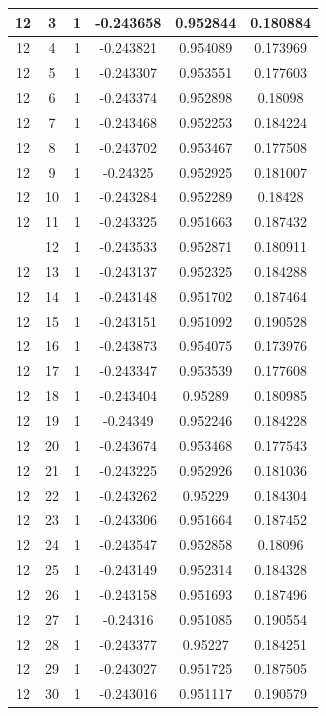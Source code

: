 \documentclass[12pt,a4paper]{article}
\numberwithin{equation}{section}
\numberwithin{figure}{section}
\numberwithin{table}{section}
\begin{document}
\begin{longtable}{|c|c|c|c|c|c|}
12 & 3 & 1 & -0.243658 & 0.952844 & 0.180884 \\ \hline
12 & 4 & 1 & -0.243821 & 0.954089 & 0.173969 \\ \hline
12 & 5 & 1 & -0.243307 & 0.953551 & 0.177603 \\ \hline
12 & 6 & 1 & -0.243374 & 0.952898 & 0.18098 \\ \hline
12 & 7 & 1 & -0.243468 & 0.952253 & 0.184224 \\ \hline
12 & 8 & 1 & -0.243702 & 0.953467 & 0.177508 \\ \hline
12 & 9 & 1 & -0.24325 & 0.952925 & 0.181007 \\ \hline
12 & 10 & 1 & -0.243284 & 0.952289 & 0.18428 \\ \hline
12 & 11 & 1 & -0.243325 & 0.951663 & 0.187432 \\ \hline
\pagebreak
12 & 12 & 1 & -0.243533 & 0.952871 & 0.180911 \\ \hline
12 & 13 & 1 & -0.243137 & 0.952325 & 0.184288 \\ \hline
12 & 14 & 1 & -0.243148 & 0.951702 & 0.187464 \\ \hline
12 & 15 & 1 & -0.243151 & 0.951092 & 0.190528 \\ \hline
12 & 16 & 1 & -0.243873 & 0.954075 & 0.173976 \\ \hline
12 & 17 & 1 & -0.243347 & 0.953539 & 0.177608 \\ \hline
12 & 18 & 1 & -0.243404 & 0.95289 & 0.180985 \\ \hline
12 & 19 & 1 & -0.24349 & 0.952246 & 0.184228 \\ \hline
12 & 20 & 1 & -0.243674 & 0.953468 & 0.177543 \\ \hline
12 & 21 & 1 & -0.243225 & 0.952926 & 0.181036 \\ \hline
12 & 22 & 1 & -0.243262 & 0.95229 & 0.184304 \\ \hline
12 & 23 & 1 & -0.243306 & 0.951664 & 0.187452 \\ \hline
12 & 24 & 1 & -0.243547 & 0.952858 & 0.18096 \\ \hline
12 & 25 & 1 & -0.243149 & 0.952314 & 0.184328 \\ \hline
12 & 26 & 1 & -0.243158 & 0.951693 & 0.187496 \\ \hline
12 & 27 & 1 & -0.24316 & 0.951085 & 0.190554 \\ \hline
12 & 28 & 1 & -0.243377 & 0.95227 & 0.184251 \\ \hline
12 & 29 & 1 & -0.243027 & 0.951725 & 0.187505 \\ \hline
12 & 30 & 1 & -0.243016 & 0.951117 & 0.190579 \\ \hline

\end{longtable}
\end{document}
